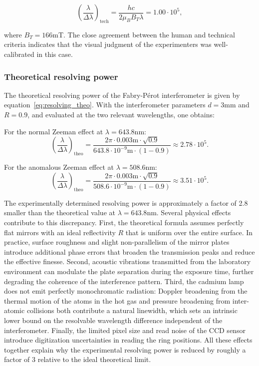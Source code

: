 \documentclass{article}
\begin{document}
\begin{equation}
    \left(\frac{\lambda}{\Delta\lambda}\right)_\mathrm{tech} = \frac{hc}{2\mu_B B_T\lambda} = 1.00 \cdot 10^5,
\end{equation}

where $B_T = 166$mT. The close agreement between the human and technical criteria indicates that the visual judgment of the experimenters was well-calibrated in this case.

\subsubsection{Theoretical resolving power}

The theoretical resolving power of the Fabry-Pérot interferometer is given by equation~\eqref{eq:resolving_theo}. With the interferometer parameters $d = 3$mm and $R = 0.9$, and evaluated at the two relevant wavelengths, one obtains:

For the normal Zeeman effect at $\lambda = 643.8$nm:
\begin{equation}
    \left(\frac{\lambda}{\Delta\lambda}\right)_\mathrm{theo} = \frac{2\pi \cdot 0.003\mathrm{m} \cdot \sqrt{0.9}}{643.8 \cdot 10^{-9}\mathrm{m} \cdot (1 - 0.9)} \approx 2.78 \cdot 10^5.
\end{equation}

For the anomalous Zeeman effect at $\lambda = 508.6$nm:
\begin{equation}
    \left(\frac{\lambda}{\Delta\lambda}\right)_\mathrm{theo} = \frac{2\pi \cdot 0.003\mathrm{m} \cdot \sqrt{0.9}}{508.6 \cdot 10^{-9}\mathrm{m} \cdot (1 - 0.9)} \approx 3.51 \cdot 10^5.
\end{equation}

The experimentally determined resolving power is approximately a factor of 2.8 smaller than the theoretical value at $\lambda = 643.8$nm. Several physical effects contribute to this discrepancy. First, the theoretical formula assumes perfectly flat mirrors with an ideal reflectivity $R$ that is uniform over the entire surface. In practice, surface roughness and slight non-parallelism of the mirror plates introduce additional phase errors that broaden the transmission peaks and reduce the effective finesse. Second, acoustic vibrations transmitted from the laboratory environment can modulate the plate separation during the exposure time, further degrading the coherence of the interference pattern. Third, the cadmium lamp does not emit perfectly monochromatic radiation: Doppler broadening from the thermal motion of the atoms in the hot gas and pressure broadening from inter-atomic collisions both contribute a natural linewidth, which sets an intrinsic lower bound on the resolvable wavelength difference independent of the interferometer. Finally, the limited pixel size and read noise of the CCD sensor introduce digitization uncertainties in reading the ring positions. All these effects together explain why the experimental resolving power is reduced by roughly a factor of 3 relative to the ideal theoretical limit.
\end{document}
